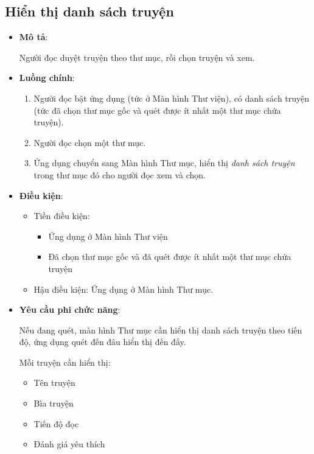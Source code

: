 \documentclass[../../thesis]{subfiles}
\begin{document}
\subsection{Hiển thị danh sách truyện}\label{sec:show-library}

\begin{itemize}
    \item
        \textbf{Mô tả}:

        Người đọc duyệt truyện theo thư mục, rồi chọn truyện và xem.
    \item
        \textbf{Luồng chính}:

        \begin{enumerate}
            \item
                Người đọc bật ứng dụng (tức ở Màn hình Thư viện), có danh sách
                truyện (tức đã chọn thư mục gốc và quét được ít nhất một thư mục
                chứa truyện).
            \item
                Người đọc chọn một thư mục.
            \item
                Ứng dụng chuyển sang Màn hình Thư mục, hiển thị \emph{danh sách
                truyện} trong thư mục đó cho người đọc xem và chọn.
        \end{enumerate}
    \item
        \textbf{Điều kiện}:

        \begin{itemize}
            \item
                Tiền điều kiện:

                \begin{itemize}
                    \item
                        Ứng dụng ở Màn hình Thư viện
                    \item
                        Đã chọn thư mục gốc và đã quét được ít nhất một thư mục
                        chứa truyện
                \end{itemize}
            \item
                Hậu điều kiện: Ứng dụng ở Màn hình Thư mục.
        \end{itemize}
    \item
        \textbf{Yêu cầu phi chức năng}:

        Nếu đang quét, màn hình Thư mục cần hiển thị danh sách truyện theo tiến
        độ, ứng dụng quét đến đâu hiển thị đến đấy.

        Mỗi truyện cần hiển thị:

        \begin{itemize}
            \item
                Tên truyện
            \item
                Bìa truyện
            \item
                Tiến độ đọc
            \item
                Đánh giá yêu thích
        \end{itemize}
  \end{itemize}
\end{document}
